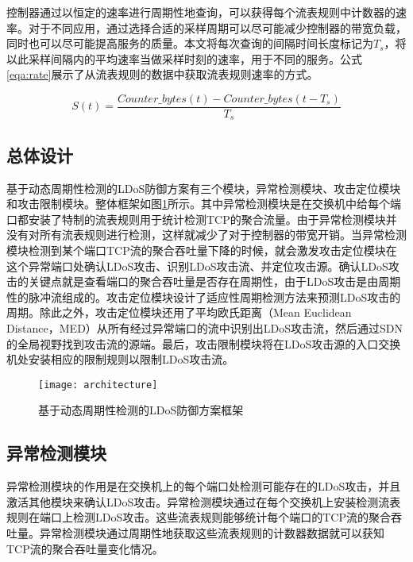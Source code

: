 控制器通过以恒定的速率进行周期性地查询，可以获得每个流表规则中计数器的速率。对于不同应用，通过选择合适的采样周期可以尽可能减少控制器的带宽负载，同时也可以尽可能提高服务的质量。本文将每次查询的间隔时间长度标记为$T_s$，将以此采样间隔内的平均速率当做采样时刻的速率，用于不同的服务。公式\ref{eqa:rate}展示了从流表规则的数据中获取流表规则速率的方式。

\vspace{-0.15in}
\begin{equation}	
	\label{eqa:rate}
	S(t) = \frac{Counter\_bytes(t) - Counter\_bytes(t - T_s)}{T_s}
\end{equation}

\subsection{总体设计}
\label{chap4:overview}

基于动态周期性检测的LDoS防御方案有三个模块，异常检测模块、攻击定位模块和攻击限制模块。整体框架如图\ref{fig:architecture}所示。其中异常检测模块是在交换机中给每个端口都安装了特制的流表规则用于统计检测TCP的聚合流量。由于异常检测模块并没有对所有流表规则进行检测，这样就减少了对于控制器的带宽开销。当异常检测模块检测到某个端口TCP流的聚合吞吐量下降的时候，就会激发攻击定位模块在这个异常端口处确认LDoS攻击、识别LDoS攻击流、并定位攻击源。确认LDoS攻击的关键点就是查看端口的聚合吞吐量是否存在周期性，由于LDoS攻击是由周期性的脉冲流组成的。攻击定位模块设计了适应性周期检测方法来预测LDoS攻击的周期。除此之外，攻击定位模块还用了平均欧氏距离（Mean Euclidean Distance，MED）从所有经过异常端口的流中识别出LDoS攻击流，然后通过SDN的全局视野找到攻击流的源端。最后，攻击限制模块将在LDoS攻击源的入口交换机处安装相应的限制规则以限制LDoS攻击流。

\begin{figure}
    \centering
    \texttt{[image: architecture]}
    \caption{基于动态周期性检测的LDoS防御方案框架}
    \label{fig:architecture}
\end{figure}

\subsection{异常检测模块}
\label{chap4:Monitor}
异常检测模块的作用是在交换机上的每个端口处检测可能存在的LDoS攻击，并且激活其他模块来确认LDoS攻击。异常检测模块通过在每个交换机上安装检测流表规则在端口上检测LDoS攻击。这些流表规则能够统计每个端口的TCP流的聚合吞吐量。异常检测模块通过周期性地获取这些流表规则的计数器数据就可以获知TCP流的聚合吞吐量变化情况。

